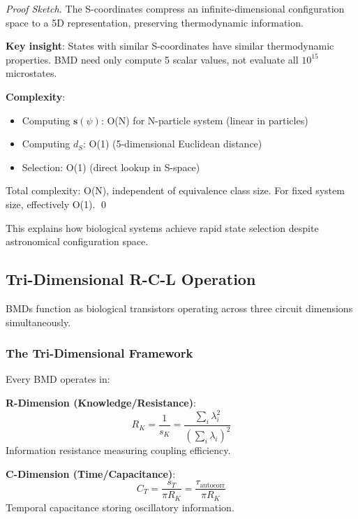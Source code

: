 \documentclass[11pt,onecolumn]{article}
\begin{document}
\begin{proof}[Proof Sketch]
The S-coordinates compress an infinite-dimensional configuration space to a 5D representation, preserving thermodynamic information.

\textbf{Key insight}: States with similar S-coordinates have similar thermodynamic properties. BMD need only compute 5 scalar values, not evaluate all $10^{15}$ microstates.

\textbf{Complexity}:
\begin{itemize}
\item Computing $\mathbf{s}(\psi)$: O(N) for N-particle system (linear in particles)
\item Computing $d_S$: O(1) (5-dimensional Euclidean distance)
\item Selection: O(1) (direct lookup in S-space)
\end{itemize}

Total complexity: O(N), independent of equivalence class size. For fixed system size, effectively O(1). \qed
\end{proof}

This explains how biological systems achieve rapid state selection despite astronomical configuration space.

\subsection{Tri-Dimensional R-C-L Operation}

BMDs function as biological transistors operating across three circuit dimensions simultaneously.

\subsubsection{The Tri-Dimensional Framework}

Every BMD operates in:

\textbf{R-Dimension (Knowledge/Resistance)}:
\begin{equation}
R_K = \frac{1}{s_K} = \frac{\sum_i \lambda_i^2}{(\sum_i \lambda_i)^2}
\end{equation}
Information resistance measuring coupling efficiency.

\textbf{C-Dimension (Time/Capacitance)}:
\begin{equation}
C_T = \frac{s_T}{\pi R_K} = \frac{\tau_{\text{autocorr}}}{\pi R_K}
\end{equation}
Temporal capacitance storing oscillatory information.
\end{document}
